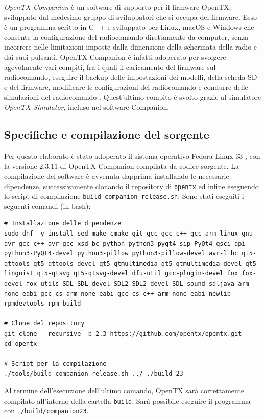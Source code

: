 \documentclass[a4paper, 12pt]{report} %
\begin{document}
\emph{OpenTX Companion} è un software di supporto per il firmware OpenTX, sviluppato dal medesimo gruppo di sviluppatori che si occupa del firmware. Esso è un programma scritto in C++ e sviluppato per Linux, macOS e Windows che consente la configurazione del radiocomando direttamente da computer, senza incorrere nelle limitazioni imposte dalla dimensione della schermata della radio e dai suoi pulsanti. OpenTX Companion è infatti adoperato per svolgere agevolmente vari compiti, fra i quali il caricamento del firmware sul radiocomando, eseguire il backup delle impostazioni dei modelli, della scheda SD e del firmware, modificare le configurazioni del radiocomando e condurre delle simulazioni del radiocomando \cite{opentx-companion-manual}. Quest'ultimo compito è svolto grazie al simulatore \emph{OpenTX Simulator}, incluso nel software Companion.

\subsection{Specifiche e compilazione del sorgente}
Per questo elaborato è stato adoperato il sistema operativo Fedora Linux $33$ \cite{fedora-website}, con la versione $2.3.11$ di OpenTX Companion compilata da codice sorgente.
La compilazione del software è avvenuta dapprima installando le necessarie dipendenze, successivamente clonando il repository di \texttt{opentx} ed infine eseguendo lo script di compilazione \texttt{build-companion-release.sh}. Sono stati eseguiti i seguenti comandi (in bash):

\begin{lstlisting}
# Installazione delle dipendenze
sudo dnf -y install sed make cmake git gcc gcc-c++ gcc-arm-linux-gnu avr-gcc-c++ avr-gcc xsd bc python python3-pyqt4-sip PyQt4-qsci-api python3-PyQt4-devel python3-pillow python3-pillow-devel avr-libc qt5-qttools qt5-qttools-devel qt5-qtmultimedia qt5-qtmultimedia-devel qt5-linguist qt5-qtsvg qt5-qtsvg-devel dfu-util gcc-plugin-devel fox fox-devel fox-utils SDL SDL-devel SDL2 SDL2-devel SDL_sound sdljava arm-none-eabi-gcc-cs arm-none-eabi-gcc-cs-c++ arm-none-eabi-newlib rpmdevtools rpm-build

# Clone del repository
git clone --recursive -b 2.3 https://github.com/opentx/opentx.git
cd opentx

# Script per la compilazione
./tools/build-companion-release.sh ../ ./build 23
\end{lstlisting}

Al termine dell'esecuzione dell'ultimo comando, OpenTX sarà correttamente compilato all'interno della cartella \texttt{build}. Sarà possibile eseguire il programma con \texttt{./build/companion23}.
\end{document}
